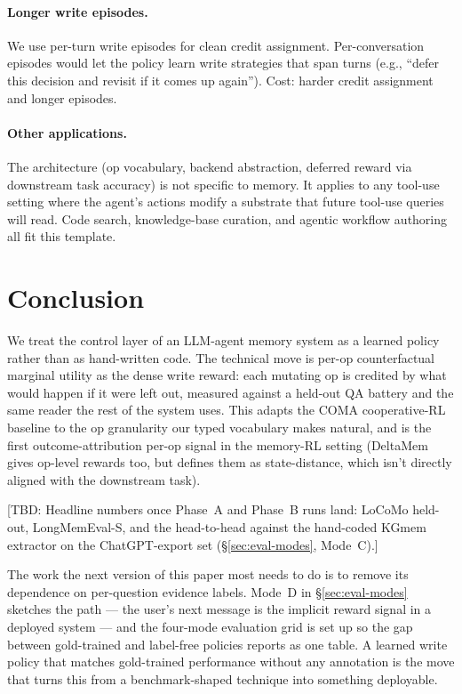 \documentclass[11pt]{article}
\newcommand{\TBD}[1]{%
  \textcolor{red!80!black}{\textsf{[TBD: #1]}}}
\begin{document}
\paragraph{Longer write episodes.} We use per-turn write episodes for
clean credit assignment. Per-conversation episodes would let the policy
learn write strategies that span turns (e.g., ``defer this decision and
revisit if it comes up again''). Cost: harder credit assignment and
longer episodes.

\paragraph{Other applications.} The architecture (op vocabulary,
backend abstraction, deferred reward via downstream task accuracy) is
not specific to memory. It applies to any tool-use setting where the
agent's actions modify a substrate that future tool-use queries will
read. Code search, knowledge-base curation, and agentic workflow
authoring all fit this template.

\section{Conclusion}

We treat the control layer of an LLM-agent memory system as a learned
policy rather than as hand-written code. The technical move is per-op
counterfactual marginal utility as the dense write reward: each
mutating op is credited by what would happen if it were left out,
measured against a held-out QA battery and the same reader the rest of
the system uses. This adapts the COMA cooperative-RL baseline to the
op granularity our typed vocabulary makes natural, and is the first
outcome-attribution per-op signal in the memory-RL setting (DeltaMem
gives op-level rewards too, but defines them as state-distance, which
isn't directly aligned with the downstream task).

\TBD{Headline numbers once Phase~A and Phase~B runs land: LoCoMo
held-out, LongMemEval-S, and the head-to-head against the hand-coded
KGmem extractor on the ChatGPT-export set
(\S\ref{sec:eval-modes}, Mode~C).}

The work the next version of this paper most needs to do is to remove
its dependence on per-question evidence labels. Mode~D in
\S\ref{sec:eval-modes} sketches the path --- the user's next message is
the implicit reward signal in a deployed system --- and the four-mode
evaluation grid is set up so the gap between gold-trained and
label-free policies reports as one table. A learned write policy that
matches gold-trained performance without any annotation is the move
that turns this from a benchmark-shaped technique into something
deployable.
\end{document}
